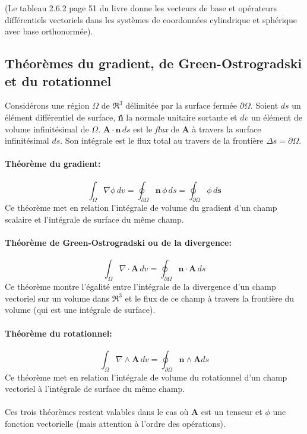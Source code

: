 (Le tableau 2.6.2 page 51 du livre donne les vecteurs de base et opérateurs différentiels vectoriels dans les systèmes de coordonnées cylindrique et sphérique avec base orthonormée).

\subsection{Théorèmes du gradient, de Green-Ostrogradski et du rotationnel}

Considérons une région $\Omega$ de $\Re^3$ délimitée par la surface fermée $\partial \Omega$. Soient $ds$ un élément différentiel de surface, \textbf{\^{n}} la normale unitaire sortante et $dv$ un élément de volume infinitésimal de $\Omega$. $\textbf{A}\cdot\textbf{\^n}\,ds$ est le \emph{flux} de \textbf{A} à travers la surface infinitésimal $ds$. Son intégrale est le flux total au travers de la frontière $\Delta s=\partial\Omega$.
\paragraph*{Théorème du gradient:} $$\int_{\Omega}\nabla\phi\, dv=\oint_{\partial\Omega}\textbf{\^n}\,\phi\,ds=\oint_{\partial\Omega}\phi\,d\textbf{s}$$
Ce théorème met en relation l'intégrale de volume du gradient d'un champ scalaire et l'intégrale de surface du même champ.
\paragraph*{Théorème de Green-Ostrogradski ou de la divergence:}
$$\int_{\Omega}\nabla\cdot\textbf{A}\,dv=\oint_{\partial\Omega}\textbf{\^n}\cdot \textbf{A}\,ds$$
Ce théorème montre l'égalité entre l'intégrale de la divergence d'un champ vectoriel sur un volume dans $\Re^3$ et le flux de ce champ à travers la frontière du volume (qui est une intégrale de surface).
\paragraph*{Théorème du rotationnel: }
$$\int_{\Omega}\nabla\wedge\textbf{A}\,dv=\oint_{\partial\Omega}\textbf{\^n}\wedge\textbf{A}ds$$
Ce théorème met en relation l'intégrale de volume du rotationnel d'un champ vectoriel à l'intégrale de surface du même champ.
\paragraph{}
Ces trois théorèmes restent valables dans le cas où \textbf{A} est un tenseur et $\phi$ une fonction vectorielle (mais attention à l'ordre des opérations).

